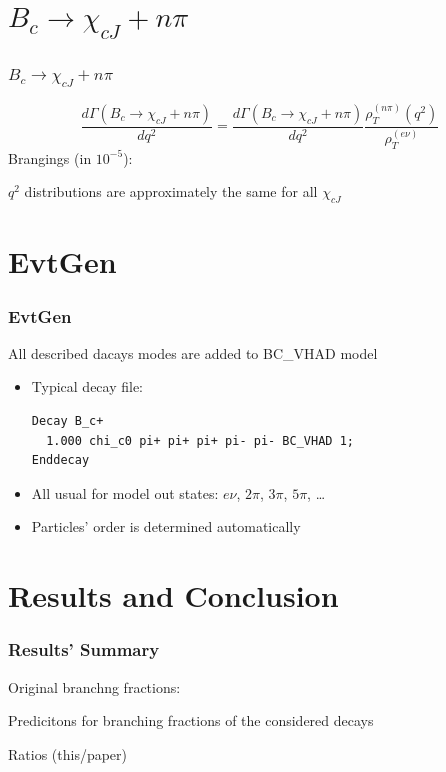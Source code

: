 \documentclass{beamer}
\begin{document}
\section{$B_c\to \chi_{cJ}+n\pi$}
\begin{frame}
  \frametitle{$B_c\to \chi_{cJ}+n\pi$}
  $$
  \frac{d\Gamma\left(B_c \to \chi_{cJ} + n\pi\right)}{dq^2} = \frac{d\Gamma\left(B_c \to \chi_{cJ} + n\pi\right)}{dq^2} \frac{\rho_T^{(n\pi)}(q^2)}{\rho_T^{(e\nu)}}
  $$
  Brangings (in $10^{-5}$):
  {\small
    
    }
  $q^2$ distributions are approximately the same for all $\chi_{cJ}$
\end{frame}

\section{EvtGen}
\begin{frame}[fragile]
  \frametitle{EvtGen}
  All described dacays modes are added to BC\_VHAD model
  \begin{itemize}
  \item   Typical decay file:
    \begin{block}{}
\begin{verbatim}
Decay B_c+
  1.000 chi_c0 pi+ pi+ pi+ pi- pi- BC_VHAD 1;
Enddecay
\end{verbatim}
    \end{block}
\item All usual for model out states: $e\nu$, $2\pi$, $3\pi$, $5\pi$, \dots 
\item Particles' order is determined automatically 
\end{itemize}


\end{frame}


\section{Results and Conclusion}
\begin{frame}
  \frametitle{Results' Summary}
  Original branchng fractions:
  {\tiny}
  
  Predicitons for branching fractions of the considered decays
  {\tiny}

  Ratios (this/paper)
  {\tiny}
  
\end{frame}
\end{document}
